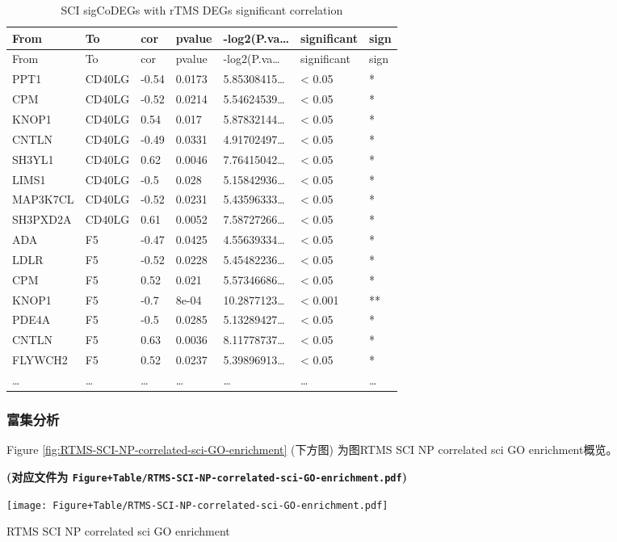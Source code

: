 \documentclass[
]{article}
\begin{document}
\begin{longtable}[]{@{}lllllll@{}}
\caption{\label{tab:SCI-sigCoDEGs-with-rTMS-DEGs-significant-correlation}SCI sigCoDEGs with rTMS DEGs significant correlation}\tabularnewline
\toprule
From & To & cor & pvalue & -log2(P.va\ldots{} & significant & sign\tabularnewline
\midrule
\endfirsthead
\toprule
From & To & cor & pvalue & -log2(P.va\ldots{} & significant & sign\tabularnewline
\midrule
\endhead
PPT1 & CD40LG & -0.54 & 0.0173 & 5.85308415\ldots{} & \textless{} 0.05 & *\tabularnewline
CPM & CD40LG & -0.52 & 0.0214 & 5.54624539\ldots{} & \textless{} 0.05 & *\tabularnewline
KNOP1 & CD40LG & 0.54 & 0.017 & 5.87832144\ldots{} & \textless{} 0.05 & *\tabularnewline
CNTLN & CD40LG & -0.49 & 0.0331 & 4.91702497\ldots{} & \textless{} 0.05 & *\tabularnewline
SH3YL1 & CD40LG & 0.62 & 0.0046 & 7.76415042\ldots{} & \textless{} 0.05 & *\tabularnewline
LIMS1 & CD40LG & -0.5 & 0.028 & 5.15842936\ldots{} & \textless{} 0.05 & *\tabularnewline
MAP3K7CL & CD40LG & -0.52 & 0.0231 & 5.43596333\ldots{} & \textless{} 0.05 & *\tabularnewline
SH3PXD2A & CD40LG & 0.61 & 0.0052 & 7.58727266\ldots{} & \textless{} 0.05 & *\tabularnewline
ADA & F5 & -0.47 & 0.0425 & 4.55639334\ldots{} & \textless{} 0.05 & *\tabularnewline
LDLR & F5 & -0.52 & 0.0228 & 5.45482236\ldots{} & \textless{} 0.05 & *\tabularnewline
CPM & F5 & 0.52 & 0.021 & 5.57346686\ldots{} & \textless{} 0.05 & *\tabularnewline
KNOP1 & F5 & -0.7 & 8e-04 & 10.2877123\ldots{} & \textless{} 0.001 & **\tabularnewline
PDE4A & F5 & -0.5 & 0.0285 & 5.13289427\ldots{} & \textless{} 0.05 & *\tabularnewline
CNTLN & F5 & 0.63 & 0.0036 & 8.11778737\ldots{} & \textless{} 0.05 & *\tabularnewline
FLYWCH2 & F5 & 0.52 & 0.0237 & 5.39896913\ldots{} & \textless{} 0.05 & *\tabularnewline
\ldots{} & \ldots{} & \ldots{} & \ldots{} & \ldots{} & \ldots{} & \ldots{}\tabularnewline
\bottomrule
\end{longtable}

\hypertarget{ux5bccux96c6ux5206ux6790}{%
\subsubsection{富集分析}\label{ux5bccux96c6ux5206ux6790}}

Figure \ref{fig:RTMS-SCI-NP-correlated-sci-GO-enrichment} (下方图) 为图RTMS SCI NP correlated sci GO enrichment概览。

\textbf{(对应文件为 \texttt{Figure+Table/RTMS-SCI-NP-correlated-sci-GO-enrichment.pdf})}

\def\@captype{figure}
\begin{center}
\texttt{[image: Figure+Table/RTMS-SCI-NP-correlated-sci-GO-enrichment.pdf]}
\caption{RTMS SCI NP correlated sci GO enrichment}\label{fig:RTMS-SCI-NP-correlated-sci-GO-enrichment}
\end{center}
\end{document}

